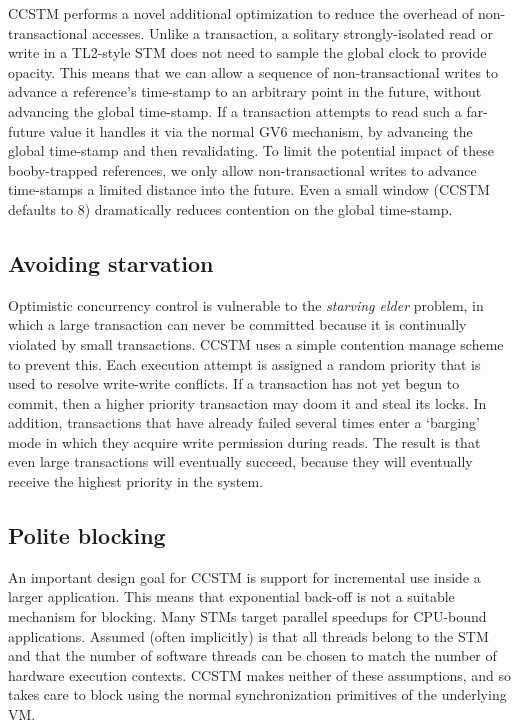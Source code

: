 CCSTM performs a novel additional optimization to reduce the overhead
of non-transactional accesses.  Unlike a transaction, a solitary
strongly-isolated read or write in a TL2-style STM does not need to
sample the global clock to provide opacity.  This means that we can allow
a sequence of non-transactional writes to advance a reference's time-stamp to
an arbitrary point in the future, without advancing the global time-stamp.
If a transaction attempts to read such a far-future value it handles
it via the normal GV6 mechanism, by advancing the global time-stamp and
then revalidating.   To limit the potential impact of these booby-trapped
references, we only allow non-transactional writes to advance time-stamps
a limited distance into the future.  Even a small window (CCSTM defaults
to 8) dramatically reduces contention on the global time-stamp.

\subsection{Avoiding starvation}

Optimistic concurrency control is vulnerable to the \textit{starving
elder} problem, in which a large transaction can never be committed because
it is continually violated by small transactions.  CCSTM uses a simple
contention manage scheme to prevent this.  Each execution attempt is
assigned a random priority that is used to resolve write-write conflicts.
If a transaction has not yet begun to commit, then a higher priority
transaction may doom it and steal its locks.  In addition, transactions
that have already failed several times enter a `barging' mode in which
they acquire write permission during reads.  The result is that even
large transactions will eventually succeed, because they will eventually
receive the highest priority in the system.

\subsection{Polite blocking}

An important design goal for CCSTM is support for incremental use inside
a larger application.  This means that exponential back-off is not a
suitable mechanism for blocking.  Many STMs target parallel speedups
for CPU-bound applications.  Assumed (often implicitly) is that all
threads belong to the STM and that the number of software threads can be
chosen to match the number of hardware execution contexts.  CCSTM makes
neither of these assumptions, and so takes care to block using the normal
synchronization primitives of the underlying VM.

